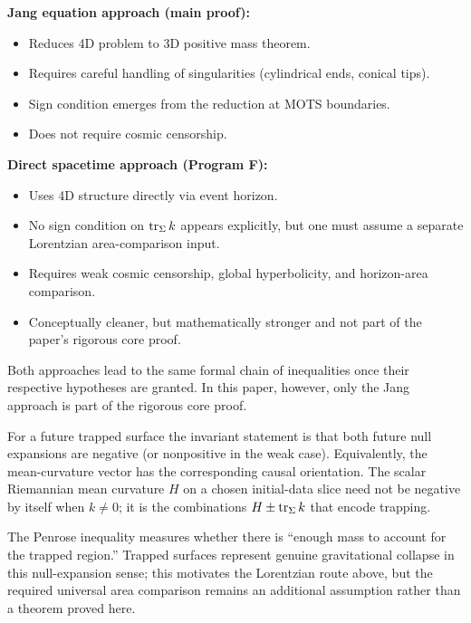 \begin{remark}
\textbf{Jang equation approach (main proof):}
\begin{itemize}
    \item Reduces 4D problem to 3D positive mass theorem.
    \item Requires careful handling of singularities (cylindrical ends, conical tips).
    \item Sign condition emerges from the reduction at MOTS boundaries.
    \item Does not require cosmic censorship.
\end{itemize}

\textbf{Direct spacetime approach (Program F):}
\begin{itemize}
    \item Uses 4D structure directly via event horizon.
    \item No sign condition on $\operatorname{tr}_\Sigma k$ appears explicitly, but one must assume a separate Lorentzian area-comparison input.
    \item Requires weak cosmic censorship, global hyperbolicity, and horizon-area comparison.
    \item Conceptually cleaner, but mathematically stronger and not part of the paper's rigorous core proof.
\end{itemize}

Both approaches lead to the same formal chain of inequalities once their respective hypotheses are granted. In this paper, however, only the Jang approach is part of the rigorous core proof.
\end{remark}

\begin{remark}
For a future trapped surface the invariant statement is that both future null expansions are negative (or nonpositive in the weak case). Equivalently, the mean-curvature vector has the corresponding causal orientation. The scalar Riemannian mean curvature $H$ on a chosen initial-data slice need not be negative by itself when $k\neq0$; it is the combinations $H\pm\operatorname{tr}_\Sigma k$ that encode trapping.

The Penrose inequality measures whether there is ``enough mass to account for the trapped region.'' Trapped surfaces represent genuine gravitational collapse in this null-expansion sense; this motivates the Lorentzian route above, but the required universal area comparison remains an additional assumption rather than a theorem proved here.
\end{remark}

